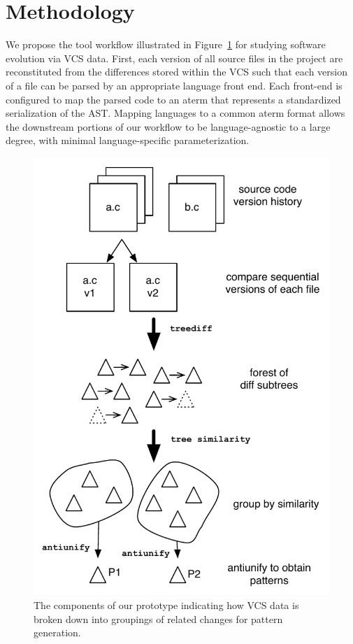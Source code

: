 \section{Methodology}
\label{sec:method}

We propose the tool workflow illustrated in Figure~\ref{fig:workflow} for
studying software evolution via VCS data. First, each version of all source
files in the project are reconstituted from the differences stored within the
VCS such that each version of a file can be parsed by an appropriate language
front end.  Each front-end is configured to map the parsed code to an aterm
that represents a standardized serialization of the AST\@.  Mapping languages
to a common aterm format allows the downstream portions of our workflow to be
language-agnostic to a large degree, with minimal language-specific
parameterization.

\begin{figure}
\begin{center}
\includegraphics[height=0.44\textheight]{figures/workflow.pdf}
\caption{The components of our prototype indicating how VCS data is
broken down into groupings of related changes for pattern generation.}
\label{fig:workflow}
\end{center}
\end{figure}

